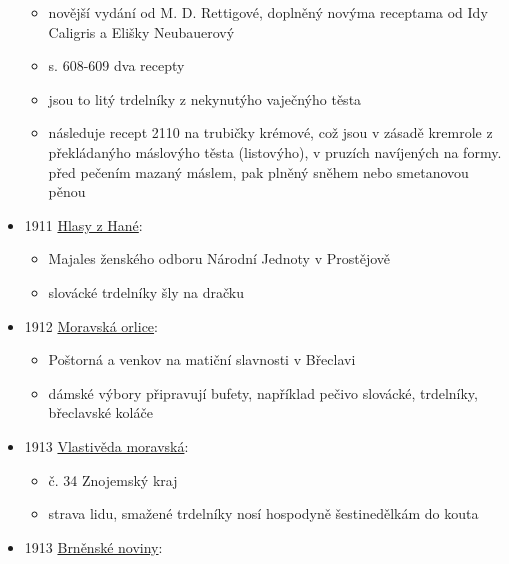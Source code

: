 \begin{itemize}
  \begin{itemize}
  \tightlist
  \item
    novější vydání od M. D. Rettigové, doplněný novýma receptama od Idy
    Caligris a Elišky Neubauerový
  \item
    s. 608-609 dva recepty
  \item
    jsou to litý trdelníky z nekynutýho vaječnýho těsta
  \item
    následuje recept 2110 na trubičky krémové, což jsou v zásadě
    kremrole z překládanýho máslovýho těsta (listovýho), v pruzích
    navíjených na formy. před pečením mazaný máslem, pak plněný sněhem
    nebo smetanovou pěnou
  \end{itemize}
\item
  1911
  \href{https://www.digitalniknihovna.cz/vkol/uuid/uuid:d4380ff6-8a62-49b7-8196-d84c1ad69a53}{Hlasy
  z Hané}:

  \begin{itemize}
  \tightlist
  \item
    Majales ženského odboru Národní Jednoty v Prostějově
  \item
    slovácké trdelníky šly na dračku
  \end{itemize}
\item
  1912
  \href{https://ceskadigitalniknihovna.cz/view/uuid:2c2f1570-b8b8-11de-b399-000d606f5dc6?page=uuid:625e3e20-b7e9-11de-8b7d-000d606f5dc6&source=mzk}{Moravská
  orlice}:

  \begin{itemize}
  \tightlist
  \item
    Poštorná a venkov na matiční slavnosti v Břeclavi
  \item
    dámské výbory připravují bufety, například pečivo slovácké,
    trdelníky, břeclavské koláče
  \end{itemize}
\item
  1913
  \href{https://ceskadigitalniknihovna.cz/view/uuid:3bc6373e-804a-44b4-b42f-50d5bf37e90d?page=uuid\%3Af7d19e61-5740-11e3-852c-0050569d679d&fulltext=trdelniky&source=mzk}{Vlastivěda
  moravská}:

  \begin{itemize}
  \tightlist
  \item
    č. 34 Znojemský kraj
  \item
    strava lidu, smažené trdelníky nosí hospodyně šestinedělkám do kouta
  \end{itemize}
\item
  1913
  \href{https://ceskadigitalniknihovna.cz/view/uuid:01729a50-78ad-11e3-a388-5ef3fc9ae867?page=uuid\%3A3eefbb60-79ca-11e3-b0d1-005056827e51&fulltext=trdeln\%C3\%ADk\%20OR\%20trdeln\%C3\%ADky\%20OR\%20trdeln\%C3\%ADk\%C5\%AF&source=mzk}{Brněnské
  noviny}:


\end{itemize}
